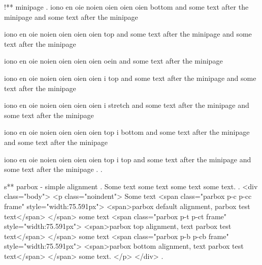 !** minipage
.
iono en oie noien oien oien oien bottom  and some text after the minipage and some text after the minipage

iono en oie noien oien oien oien top  and some text after the minipage and some text after the minipage


iono en oie noien oien oien oien oein  and some text after the minipage

iono en oie noien oien oien oien i top  and some text after the minipage and some text after the minipage

iono en oie noien oien oien oien i stretch  and some text after the minipage and some text after the minipage

iono en oie noien oien oien oien top i bottom  and some text after the minipage and some text after the minipage

iono en oie noien oien oien oien top i top  and some text after the minipage and some text after the minipage
.
.


s** parbox - simple alignment
.
\noindent
Some text
some text
some text
some text.
.
<div class="body">
<p class="noindent">
Some text <span class="parbox p-c p-cc frame" style="width:75.591px">
<span>parbox default alignment, parbox test text</span>
</span>​ some text <span class="parbox p-t p-ct frame" style="width:75.591px">
<span>parbox top alignment, text parbox test text</span>
</span>​ some text <span class="parbox p-b p-cb frame" style="width:75.591px">
<span>parbox bottom alignment, text parbox test text</span>
</span>​ some text.
</p>
</div>
.


